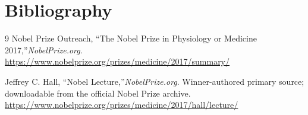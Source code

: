 \section{Bibliography}

\begin{thebibliography}{9}
Nobel Prize Outreach, ``The Nobel Prize in Physiology or Medicine 2017,''\emph{NobelPrize.org}.\\
\url{https://www.nobelprize.org/prizes/medicine/2017/summary/}

Jeffrey C. Hall, ``Nobel Lecture,''\emph{NobelPrize.org}. Winner-authored primary source; downloadable from the official Nobel Prize archive.\\
\url{https://www.nobelprize.org/prizes/medicine/2017/hall/lecture/}
\end{thebibliography}
